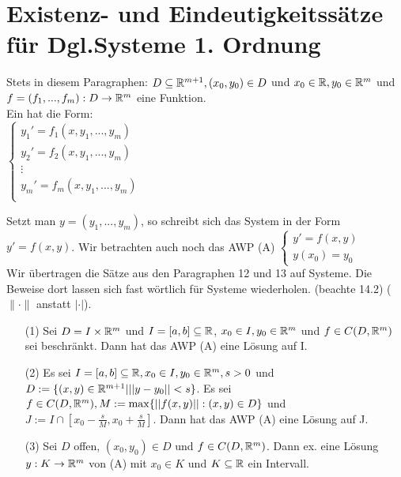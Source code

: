 \documentclass[a4paper,twoside,DIV15,BCOR12mm]{scrbook}
\begin{document}
\chapter{Existenz- und Eindeutigkeitssätze für Dgl.Systeme 1. Ordnung}

Stets in diesem Paragraphen: $D \subseteq \mathbb{R}^{m+1}, (x_0,y_0) \in D$ und $x_0 \in \mathbb{R}, 
y_0 \in \mathbb{R}^m$ und $f=(f_1,...,f_m): D \to \mathbb{R}^m$ eine Funktion.\\
Ein  hat die Form: \\
$
\begin{cases} 
y_1' = f_1(x,y_1,...,y_m) \\
y_2' = f_2(x,y_1,...,y_m) \\
\vdots \\
y_m' = f_m(x,y_1,...,y_m)\\ 
\end{cases}$

Setzt man $y=(y_1,...,y_m)$, so schreibt sich das System in der Form $y' = f(x,y)$. Wir 
betrachten auch noch das AWP (A) $\begin{cases} y' = f(x,y) \\ y(x_0) = y_0 \end{cases}$ \\
Wir übertragen die Sätze aus den Paragraphen 12 und 13 auf Systeme. Die Beweise dort lassen sich fast wörtlich für Systeme wiederholen. (beachte 14.2) ($\|\cdot\|$ anstatt $|\cdot|$).

\begin{satz} [Peano]


\begin{itemize}
\item[(1)] 
Sei $D=I \times \mathbb{R}^m$ und $I=[a,b] \subseteq \mathbb{R}$, $x_0 \in I, y_0 \in \mathbb{R}^m$ und $ f \in C(D,\mathbb{R}^m)$ sei beschränkt. Dann hat das AWP (A) eine Lösung auf I.

\item[(2)] 
Es sei $I = [a,b] \subseteq \mathbb{R}, x_0 \in I, y_0 \in \mathbb{R}^m, s > 0$ und 
$D:=\{(x,y) \in \mathbb{R}^{m+1} | ||y-y_0|| < s\}$.
Es sei $f \in C(D,\mathbb{R}^m), M := \max \{ ||f(x,y)|| : (x,y) \in D \}$ und 
$J := I \cap [x_0-\frac{s}{M},x_0+\frac{s}{M}].$ Dann hat das AWP (A) eine Lösung auf J.

\item[(3)] Sei $D$ offen, $(x_0,y_0) \in D$ und $f \in C(D, \mathbb{R}^m)$. Dann ex. eine Lösung 
$y: K \to \mathbb{R}^m$ von (A) mit $x_0 \in K$ und $ K \subseteq \mathbb{R}$ ein Intervall.
\end{itemize}
\end{satz}
\end{document}
